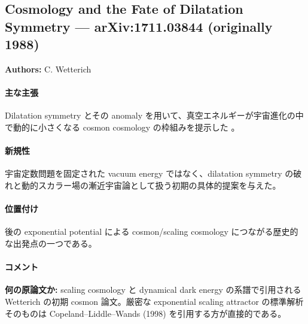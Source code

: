 \subsection{Cosmology and the Fate of Dilatation Symmetry --- arXiv:1711.03844 (originally 1988)}

\textbf{Authors:} C. Wetterich

\paragraph{主な主張}
Dilatation symmetry とその anomaly を用いて、真空エネルギーが宇宙進化の中で動的に小さくなる cosmon cosmology の枠組みを提示した \cite{Wetterich:1988dilatation}。

\paragraph{新規性}
宇宙定数問題を固定された vacuum energy ではなく、dilatation symmetry の破れと動的スカラー場の漸近宇宙論として扱う初期の具体的提案を与えた。

\paragraph{位置付け}
後の exponential potential による cosmon/scaling cosmology につながる歴史的な出発点の一つである。

\paragraph{コメント}
\textbf{何の原論文か:} scaling cosmology と dynamical dark energy の系譜で引用される Wetterich の初期 cosmon 論文。厳密な exponential scaling attractor の標準解析そのものは Copeland--Liddle--Wands (1998) を引用する方が直接的である。
